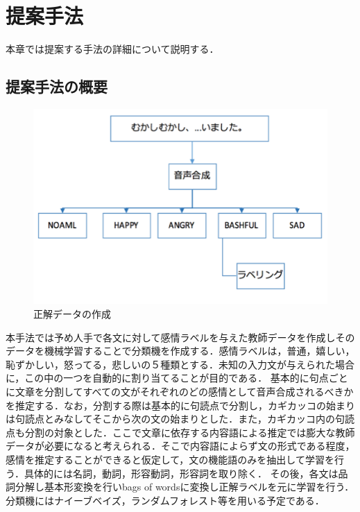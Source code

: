 \chapter{提案手法}

本章では提案する手法の詳細について説明する．

\section{提案手法の概要}

\begin{figure}[htbp]
\begin{center}
\includegraphics[width=15cm,clip,bb=0 0 349 232]{fig/create_data.png}
\caption{正解データの作成}\label{create_data}
\end{center}
\end{figure}

本手法では予め人手で各文に対して感情ラベルを与えた教師データを作成しそのデータを機械学習することで分類機を作成する．感情ラベルは，普通，嬉しい，恥ずかしい，怒ってる，悲しいの５種類とする．未知の入力文が与えられた場合に，この中の一つを自動的に割り当てることが目的である．
基本的に句点ごとに文章を分割してすべての文がそれぞれのどの感情として音声合成されるべきかを推定する．なお，分割する際は基本的に句読点で分割し，カギカッコの始まりは句読点とみなしてそこから次の文の始まりとした．また，カギカッコ内の句読点も分割の対象とした．ここで文章に依存する内容語による推定では膨大な教師データが必要になると考えられる．そこで内容語によらず文の形式である程度，感情を推定することができると仮定して，文の機能語のみを抽出して学習を行う．具体的には名詞，動詞，形容動詞，形容詞を取り除く．
その後，各文は品詞分解し基本形変換を行いbags of wordsに変換し正解ラベルを元に学習を行う．分類機にはナイーブベイズ，ランダムフォレスト等を用いる予定である．

